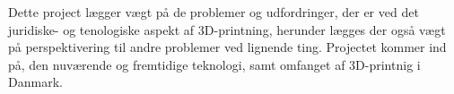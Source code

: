 Dette project lægger vægt på de problemer og udfordringer, der er ved det juridiske- og tenologiske aspekt af 3D-printning, herunder lægges der også vægt på perspektivering til andre problemer ved lignende ting. Projectet kommer ind på, den nuværende og fremtidige teknologi, samt omfanget af 3D-printnig i Danmark.